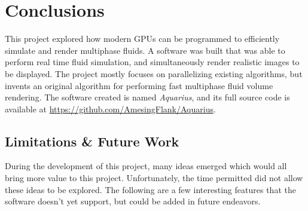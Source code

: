 \chapter{Conclusions}
\label{chapter conclusions}

This project explored how modern GPUs can be programmed to efficiently simulate and render multiphase fluids. A software was built that was able to perform real time fluid simulation, and simultaneously render realistic images to be displayed. The project mostly focuses on parallelizing existing algorithms, but invents an original algorithm for performing fast multiphase fluid volume rendering. The software created is named \textit{Aquarius}, and its full source code is available at \url{https://github.com/AmesingFlank/Aquarius}.


\section{Limitations \& Future Work}
\label{section future work}

During the development of this project, many ideas emerged which would all bring more value to this project. Unfortunately, the time permitted did not allow these ideas to be explored. The following are a few interesting features that the software doesn't yet support, but could be added in future endeavors.



